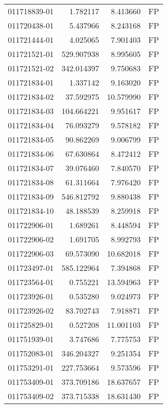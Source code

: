 \begin{tabular}{lrrl}
011718839-01 &    1.782117 &       8.413660 &   FP \\
011720438-01 &    5.437966 &       8.243168 &   FP \\
011721444-01 &    4.025065 &       7.901403 &   FP \\
011721521-01 &  529.907938 &       8.995605 &   FP \\
011721521-02 &  342.014397 &       9.750683 &   FP \\
011721834-01 &    1.337142 &       9.163020 &   FP \\
011721834-02 &   37.592975 &      10.579990 &   FP \\
011721834-03 &  104.664221 &       9.951617 &   FP \\
011721834-04 &   76.093279 &       9.578182 &   FP \\
011721834-05 &   90.862269 &       9.006799 &   FP \\
011721834-06 &   67.630864 &       8.472412 &   FP \\
011721834-07 &   39.076460 &       7.840570 &   FP \\
011721834-08 &   61.311664 &       7.976420 &   FP \\
011721834-09 &  546.812792 &       9.880438 &   FP \\
011721834-10 &   48.188539 &       8.259918 &   FP \\
011722906-01 &    1.689261 &       8.448594 &   FP \\
011722906-02 &    1.691705 &       8.992793 &   FP \\
011722906-03 &   69.573090 &      10.682018 &   FP \\
011723497-01 &  585.122964 &       7.394868 &   FP \\
011723564-01 &    0.755221 &      13.594963 &   FP \\
011723926-01 &    0.535280 &       9.024973 &   FP \\
011723926-02 &   83.702743 &       7.918871 &   FP \\
011725829-01 &    0.527208 &      11.001103 &   FP \\
011751939-01 &    3.747686 &       7.775753 &   FP \\
011752083-01 &  346.204327 &       9.251354 &   FP \\
011753291-01 &  227.753664 &       9.573596 &   FP \\
011753409-01 &  373.709186 &      18.637657 &   FP \\
011753409-02 &  373.715338 &      18.631430 &   FP \\

\end{tabular}
